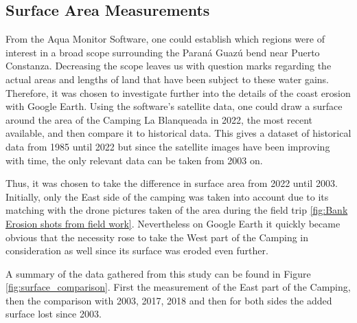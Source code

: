 \subsection{Surface Area Measurements}
From the Aqua Monitor Software, one could establish which regions were of interest in a broad scope surrounding the Paraná Guazú bend near Puerto Constanza. Decreasing the scope leaves us with question marks regarding the actual areas and lengths of land that have been subject to these water gains. Therefore, it was chosen to investigate further into the details of the coast erosion with Google Earth.
Using the software's satellite data, one could draw a surface around the area of the Camping La Blanqueada in 2022, the most recent available, and then compare it to historical data. 
This gives a dataset of historical data from 1985 until 2022 but since the satellite images have been improving with time, the only relevant data can be taken from 2003 on.


Thus, it was chosen to take the difference in surface area from 2022 until 2003. Initially, only the East side of the camping was taken into account due to its matching with the drone pictures taken of the area during the field trip \ref{fig:Bank Erosion shots from field work}. Nevertheless on Google Earth it quickly became obvious that the necessity rose to take the West part of the Camping in consideration as well since its surface was eroded even further.

A summary of the data gathered from this study can be found in Figure \ref{fig:surface_comparison}. First the measurement of the East part of the Camping, then the comparison with 2003, 2017, 2018 and then for both sides the added surface lost since 2003.

